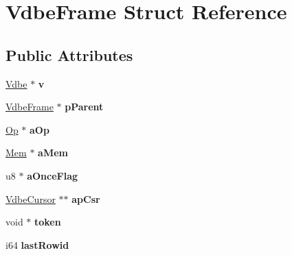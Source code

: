 \hypertarget{struct_vdbe_frame}{\section{Vdbe\-Frame Struct Reference}
\label{struct_vdbe_frame}
}
\subsection*{Public Attributes}
\begin{DoxyCompactItemize}
\item 
\hypertarget{struct_vdbe_frame_a2f6258356959c94398d1d006a740c4ce}{\hyperlink{struct_vdbe}{Vdbe} $\ast$ {\bfseries v}}\label{struct_vdbe_frame_a2f6258356959c94398d1d006a740c4ce}

\item 
\hypertarget{struct_vdbe_frame_afb11d8aa920f34720333f52737375d59}{\hyperlink{struct_vdbe_frame}{Vdbe\-Frame} $\ast$ {\bfseries p\-Parent}}\label{struct_vdbe_frame_afb11d8aa920f34720333f52737375d59}

\item 
\hypertarget{struct_vdbe_frame_a0e5670c52e8eeb7e66bf1e3bff8ce2b5}{\hyperlink{struct_vdbe_op}{Op} $\ast$ {\bfseries a\-Op}}\label{struct_vdbe_frame_a0e5670c52e8eeb7e66bf1e3bff8ce2b5}

\item 
\hypertarget{struct_vdbe_frame_a98b9eabf633e77d4ae2dfe9d13a43fdf}{\hyperlink{struct_mem}{Mem} $\ast$ {\bfseries a\-Mem}}\label{struct_vdbe_frame_a98b9eabf633e77d4ae2dfe9d13a43fdf}

\item 
\hypertarget{struct_vdbe_frame_a92608c14f2aa3be81e65d59000ef8bd8}{u8 $\ast$ {\bfseries a\-Once\-Flag}}\label{struct_vdbe_frame_a92608c14f2aa3be81e65d59000ef8bd8}

\item 
\hypertarget{struct_vdbe_frame_a5d373b3a195dbd1a31f5aa0dbe1822ee}{\hyperlink{struct_vdbe_cursor}{Vdbe\-Cursor} $\ast$$\ast$ {\bfseries ap\-Csr}}\label{struct_vdbe_frame_a5d373b3a195dbd1a31f5aa0dbe1822ee}

\item 
\hypertarget{struct_vdbe_frame_a11de10011ea2164995c6b616bba8a576}{void $\ast$ {\bfseries token}}\label{struct_vdbe_frame_a11de10011ea2164995c6b616bba8a576}

\item 
\hypertarget{struct_vdbe_frame_af655193217fb53c7acab9d24c94344aa}{i64 {\bfseries last\-Rowid}}\label{struct_vdbe_frame_af655193217fb53c7acab9d24c94344aa}


\end{DoxyCompactItemize}
